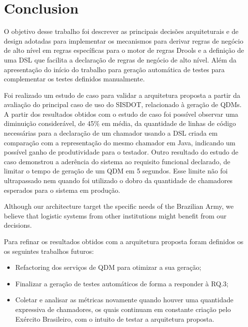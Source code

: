 \section{Conclusion}
\label{sec:conclusao}

O objetivo desse trabalho foi descrever as principais decisões arquiteturais e de design adotadas para implementar os mecanismos para derivar regras de negócio de alto nível em regras específicas para o motor de regras Drools e a definição de uma DSL que facilita a declaração de regras de negócio de alto nível. Além da apresentação do início do trabalho para geração automática de testes para complementar os testes definidos manualmente.

Foi realizado um estudo de caso para validar a arquitetura proposta a partir da avaliação do principal caso de uso do SISDOT, relacionado à geração de QDMs. A partir dos resultados obtidos com o estudo de caso foi possível observar uma diminuição considerável, de 45\% em média, da quantidade de linhas de código necessárias para a declaração de um chamador usando a DSL criada em comparação com a representação do mesmo chamador em Java, indicando um possível ganho de produtividade para o testador. Outro resultado do estudo de caso demonstrou a aderência do sistema ao requisito funcional declarado, de limitar o tempo de geração de um QDM em 5 segundos. Esse limite não foi ultrapassado nem quando foi utilizado o dobro da quantidade de chamadores esperados para o sistema em produção.

Although our architecture target the specific needs of the Brazilian Army, we believe that logistic systems from other institutions might benefit from our decisions.

Para refinar os resultados obtidos com a arquitetura proposta foram definidos os os seguintes trabalhos futuros:

\begin{itemize}
\item Refactoring dos serviços de QDM para otimizar a sua geração;
\item Finalizar a geração de testes automáticos de forma a responder à RQ.3;
\item Coletar e analisar as métricas novamente quando houver uma quantidade expressiva de chamadores, os quais continuam em constante criação pelo Exército Brasileiro, com o intuito de testar a arquitetura proposta.

\end{itemize}